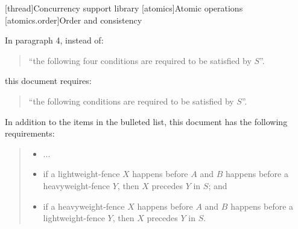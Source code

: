 

\setcounter{chapter}{32}
[thread]{Concurrency support library}
\setcounter{section}{4}
[atomics]{Atomic operations}
\setcounter{subsection}{3}
[atomics.order]{Order and consistency}

In  paragraph 4, instead of:

\begin{quote}
``the following four conditions are required to be satisfied by $S$''.
\end{quote}

this document requires:

\begin{quote}
``the following conditions are required to be satisfied by $S$''.
\end{quote}

In addition to the items in the bulleted list, this document has the
following requirements:
\begin{quote}
\pnum
\begin{itemize}
\item
  ...
\item
if a  lightweight-fence $X$ happens before $A$ and $B$ happens
before a  heavyweight-fence $Y$, then $X$ precedes $Y$ in $S$; and
\item  if a  heavyweight-fence $X$ happens before $A$ and $B$ happens
before a  lightweight-fence $Y$, then $X$ precedes $Y$ in $S$.
\end{itemize}
\end{quote}
